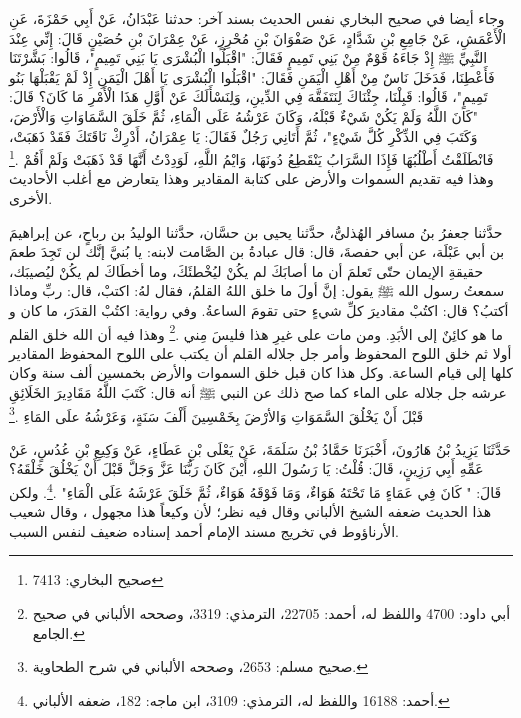 وجاء أيضا في صحيح البخاري نفس الحديث بسند آخر:
حدثنا عَبْدَانُ، عَنْ أَبِي حَمْزَةَ، عَنِ الْأَعْمَشِ، عَنْ جَامِعِ بْنِ شَدَّادٍ، عَنْ صَفْوَانَ بْنِ مُحْرِزٍ، عَنْ عِمْرَانَ بْنِ حُصَيْنٍ قَالَ: إِنِّي عِنْدَ النَّبِيِّ ﷺ إِذْ جَاءَهُ قَوْمٌ مِنْ بَنِي تَمِيمٍ فَقَالَ: "اقْبَلُوا الْبُشْرَى يَا بَنِي تَمِيمٍ"، قَالُوا: بَشَّرْتَنَا فَأَعْطِنَا، فَدَخَلَ نَاسٌ مِنْ أَهْلِ الْيَمَنِ فَقَالَ: "اقْبَلُوا الْبُشْرَى يَا أَهْلَ الْيَمَنِ إِذْ لَمْ يَقْبَلْهَا بَنُو تَمِيمٍ"، قَالُوا: قَبِلْنَا، جِئْنَاكَ لِنَتَفَقَّهَ فِي الدِّينِ، وَلِنَسْأَلَكَ عَنْ أَوَّلِ هَذَا الْأَمْرِ مَا كَانَ؟ قَالَ: "كَانَ اللَّهُ وَلَمْ يَكُنْ شَيْءٌ قَبْلَهُ، وَكَانَ عَرْشُهُ عَلَى الْمَاءِ، ثُمَّ خَلَقَ السَّمَاوَاتِ وَالْأَرْضَ، وَكَتَبَ فِي الذِّكْرِ كُلَّ شَيْءٍ"، ثُمَّ أَتَانِي رَجُلٌ فَقَالَ: يَا عِمْرَانُ، أَدْرِكْ نَاقَتَكَ فَقَدْ ذَهَبَتْ، فَانْطَلَقْتُ أَطْلُبُهَا فَإِذَا السَّرَابُ يَنْقَطِعُ دُونَهَا، وَايْمُ اللَّهِ، لَوَدِدْتُ أَنَّهَا قَدْ ذَهَبَتْ وَلَمْ أَقُمْ \href{https://shamela.ws/book/1284/4624#p6}{\faExternalLink} \cite{bukhari}.\footnote{صحيح البخاري: 7413} وهذا فيه تقديم السموات والأرض على كتابة المقادير وهذا يتعارض مع أغلب الأحاديث الأخرى.

حدَّثنا جعفرُ بنُ مسافر الهُذلىُّ، حدَّثنا يحيى بن حسَّان، حدَّثنا الوليدُ بن رباحٍ، عن إبراهيمَ بن أبي عَبْلَة، عن أبي حفصةَ، قال: قال عبادةُ بن الصَّامت لابنه: يا بُنيَّ إنَّك لن تَجِدَ طعمَ حقيقةِ الإيمان حتّى تَعلمَ أن ما أصابَكَ لم يكُنْ ليُخْطئَكَ، وما أخطَاكَ لم يكُنْ ليُصيبَك، سمعتُ رسول الله ﷺ يقول: إنَّ أولَ ما خلق اللهُ القلمُ، فقال لهُ: اكتبْ، قال: ربِّ وماذا أكتبُ؟ قال: اكتُبْ مقاديرَ كلِّ شيءٍ حتى تقومَ الساعةُ. وفي رواية: اكتُبْ القدَرَ، ما كان و ما هو كائِنٌ إلى الأبَدِ. ومن مات على غيرِ هذا فليسَ مِني \href{https://shamela.ws/book/117359/3975#p2}{\faExternalLink} \cite{SunanAbiDawood}.\footnote{أبي داود: 4700 واللفظ له، أحمد: 22705، الترمذي: 3319، وصححه الألباني في صحيح الجامع.} وهذا فيه أن الله خلق القلم أولا ثم خلق اللوح المحفوظ وأمر جل جلاله القلم أن يكتب على اللوح المحفوظ المقادير كلها إلى قيام الساعة. وكل هذا كان قبل خلق السموات والأرض بخمسين ألف سنة وكان عرشه جل جلاله على الماء كما صح ذلك عن النبي ﷺ أنه قال:  كَتَبَ اللَّهُ مَقَادِيرَ الخَلَائِقِ قَبْلَ أَنْ يَخْلُقَ السَّمَوَاتِ وَالأرْضَ بِخَمْسِينَ أَلْفَ سَنَةٍ، وَعَرْشُهُ علَى المَاءِ \href{https://shamela.ws/book/1727/6683#p2}{\faExternalLink} \cite{muslim}.\footnote{صحيح مسلم: 2653، وصححه الألباني في شرح الطحاوية.}

حَدَّثَنَا يَزِيدُ بْنُ هَارُونَ، أَخْبَرَنَا حَمَّادُ بْنُ سَلَمَةَ، عَنْ يَعْلَى بْنِ عَطَاءٍ، عَنْ وَكِيعِ بْنِ عُدُسٍ، عَنْ عَمِّهِ أَبِي رَزِينٍ، قَالَ: قُلْتُ: يَا رَسُولَ اللهِ، أَيْنَ كَانَ رَبُّنَا عَزَّ وَجَلَّ قَبْلَ أَنْ يَخْلُقَ خَلْقَهُ؟ قَالَ: " كَانَ فِي عَمَاءٍ مَا تَحْتَهُ هَوَاءٌ، وَمَا فَوْقَهُ هَوَاءٌ، ثُمَّ خَلَقَ عَرْشَهُ عَلَى الْمَاءِ" \href{https://shamela.ws/book/25794/12650#p1}{\faExternalLink} \cite{ahmid}.\footnote{أحمد: 16188 واللفظ له، الترمذي: 3109، ابن ماجه: 182، ضعفه الألباني.}.  ولكن هذا الحديث ضعفه الشيخ الألباني وقال فيه نظر؛ لأن وكيعاً هذا مجهول \href{https://shamela.ws/book/9442/5278#p10}{\faExternalLink} \cite{albani_Sahiha}، وقال شعيب الأرناؤوط في تخريج مسند الإمام أحمد إسناده ضعيف لنفس السبب.
